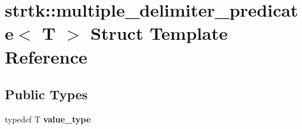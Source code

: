 \hypertarget{structstrtk_1_1multiple__delimiter__predicate}{\section{strtk\-:\-:multiple\-\_\-delimiter\-\_\-predicate$<$ T $>$ Struct Template Reference}
\label{structstrtk_1_1multiple__delimiter__predicate}
}
\subsection*{Public Types}
\begin{DoxyCompactItemize}
\item 
\hypertarget{structstrtk_1_1multiple__delimiter__predicate_a6855480d884e88fb8add8b46a8a2b952}{typedef T {\bfseries value\-\_\-type}}\label{structstrtk_1_1multiple__delimiter__predicate_a6855480d884e88fb8add8b46a8a2b952}

\end{DoxyCompactItemize}
